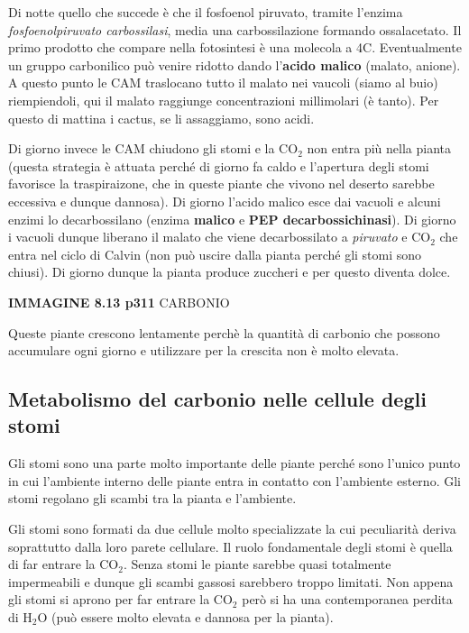 \documentclass[]{article}
\begin{document}
Di notte quello che succede è che il fosfoenol piruvato, tramite
l'enzima \emph{fosfoenolpiruvato carbossilasi}, media una
carbossilazione formando ossalacetato. Il primo prodotto che compare
nella fotosintesi è una molecola a 4C. Eventualmente un gruppo
carbonilico può venire ridotto dando l'\textbf{acido malico} (malato,
anione). A questo punto le CAM traslocano tutto il malato nei vaucoli
(siamo al buio) riempiendoli, qui il malato raggiunge concentrazioni
millimolari (è tanto). Per questo di mattina i cactus, se li assaggiamo,
sono acidi.

Di giorno invece le CAM chiudono gli stomi e la CO$_2$ non entra più
nella pianta (questa strategia è attuata perché di giorno fa caldo e
l'apertura degli stomi favorisce la traspiraizone, che in queste piante
che vivono nel deserto sarebbe eccessiva e dunque dannosa). Di giorno
l'acido malico esce dai vacuoli e alcuni enzimi lo decarbossilano
(enzima \textbf{malico} e \textbf{PEP decarbossichinasi}). Di giorno i
vacuoli dunque liberano il malato che viene decarbossilato a
\emph{piruvato} e CO$_2$ che entra nel ciclo di Calvin (non può uscire
dalla pianta perché gli stomi sono chiusi). Di giorno dunque la pianta
produce zuccheri e per questo diventa dolce.

\textbf{IMMAGINE 8.13 p311} CARBONIO

Queste piante crescono lentamente perchè la quantità di carbonio che
possono accumulare ogni giorno e utilizzare per la crescita non è molto
elevata.

\subsection{Metabolismo del carbonio nelle cellule degli
stomi}\label{metabolismo-del-carbonio-nelle-cellule-degli-stomi}

Gli stomi sono una parte molto importante delle piante perché sono
l'unico punto in cui l'ambiente interno delle piante entra in contatto
con l'ambiente esterno. Gli stomi regolano gli scambi tra la pianta e
l'ambiente.

Gli stomi sono formati da due cellule molto specializzate la cui
peculiarità deriva soprattutto dalla loro parete cellulare. Il ruolo
fondamentale degli stomi è quella di far entrare la CO$_2$. Senza stomi
le piante sarebbe quasi totalmente impermeabili e dunque gli scambi
gassosi sarebbero troppo limitati. Non appena gli stomi si aprono per
far entrare la CO$_2$ però si ha una contemporanea perdita di H$_2$O
(può essere molto elevata e dannosa per la pianta).
\end{document}
